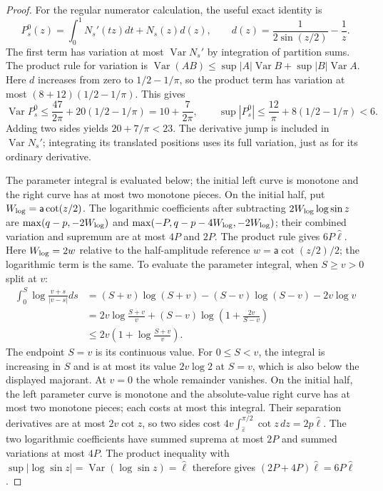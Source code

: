 \begin{proof}
For the regular numerator calculation, the useful exact identity is
\[
 P_s^0(z)=\int_0^1N_s'(tz)dt+N_s(z)d(z),
 \qquad d(z)=\frac1{2\sin(z/2)}-\frac1z.
\]
The first term has variation at most $\operatorname{Var}N_s'$
by integration of partition sums. The product rule for variation is
$\operatorname{Var}(AB)\leq\sup|A|\operatorname{Var}B+
\sup|B|\operatorname{Var}A$. Here $d$ increases from zero to
$1/2-1/\pi$, so the product term has variation at most
$(8+12)(1/2-1/\pi)$. This gives
\[
 \operatorname{Var}P_s^0\leq\frac{47}{2\pi}
                 +20(1/2-1/\pi)=10+\frac7{2\pi},
 \qquad
 \sup|P_s^0|\leq\frac{12}\pi+8(1/2-1/\pi)<6.
\]
Adding two sides yields $20+7/\pi<23$. The derivative jump is included
in $\operatorname{Var}N_s'$; integrating its translated positions
uses its full variation, just as for its ordinary derivative.

The parameter integral is evaluated below; the initial left curve
is monotone and the right curve has at most two monotone pieces.
On the initial half,
put $W_{\rm log}=\mathsf{a}\cot(z/2)$. The logarithmic coefficients after subtracting
$2W_{\rm log}\log\sin z$ are $\max(q-p,-2W_{\rm log})$ and
$\max(-P,q-p-4W_{\rm log},-2W_{\rm log})$; their combined variation and supremum are
at most $4P$ and $2P$. The product rule gives $6P\hat{\ell}$.
Here $W_{\rm log}=2w$ relative to the half-amplitude reference
$w=\mathsf a\cot(z/2)/2$; the logarithmic term is the same.
To evaluate the parameter integral, when $S\geq v>0$ split at $v$:
\[
 \begin{aligned}
 \int_0^S\log\frac{v+s}{|v-s|}ds
 &=(S+v)\log(S+v)-(S-v)\log(S-v)-2v\log v\\
 &=2v\log\frac{S+v}{v}
       +(S-v)\log\left(1+\frac{2v}{S-v}\right)\\
 &\leq2v\left(1+\log\frac{S+v}{v}\right).
 \end{aligned}
\]
The endpoint $S=v$ is its continuous value. For $0\leq S<v$,
the integral is increasing in $S$ and is at most its value
$2v\log2$ at $S=v$, which is also below the displayed majorant.
At $v=0$ the whole remainder vanishes. On the initial half, the left parameter curve is
monotone and the absolute-value right curve has at most two monotone
pieces; each costs at most this integral. Their separation derivatives
are at most $2v\cot z$, so two sides cost
$4v\int_{\hat{\varepsilon}}^{\pi/2}\cot z\,dz=2p\hat{\ell}$.
The two logarithmic coefficients have summed suprema at most $2P$
and summed variations at most $4P$. The product inequality with
$\sup|\log\sin z|=\operatorname{Var}(\log\sin z)=\hat{\ell}$
therefore gives $(2P+4P)\hat{\ell}=6P\hat{\ell}$.


\end{proof}
